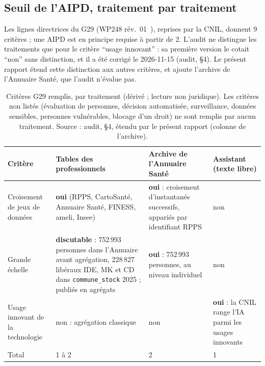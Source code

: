 \subsection{Seuil de l'AIPD, traitement par traitement}\label{conf:aipd}

Les lignes directrices du G29 (WP248 rév.~01~\citep{e-wp248}), reprises par la CNIL, donnent 9\mesure{} critères ; une AIPD est en principe requise à partir de 2\mesure{}.
L'audit ne distingue les traitements que pour le critère \enquote{usage innovant} : sa première version le cotait \enquote{non} sans distinction, et il a été corrigé le 2026-11-15 (audit, §4).
Le présent rapport étend cette distinction aux autres critères, et ajoute l'archive de l'Annuaire Santé, que l'audit n'évalue pas.

\begin{table}[htbp]\centering\small
\caption{Critères G29 remplis, par traitement (dérivé ; lecture non juridique). Les critères non listés (évaluation de personnes, décision automatisée, surveillance, données sensibles, personnes vulnérables, blocage d'un droit) ne sont remplis par aucun traitement. Source : audit, §4, étendu par le présent rapport (colonne de l'archive).}\label{conf:tab-aipd}
\begin{tabular}{@{}p{}p{}p{}p{}@{}}
\toprule Critère & Tables des professionnels & Archive de l'Annuaire Santé & Assistant (texte libre) \\ \midrule
Croisement de jeux de données & \textbf{oui} (RPPS, CartoSanté, Annuaire Santé, FINESS, ameli, Insee) & \textbf{oui} : croisement d'instantanés successifs, appariés par identifiant RPPS & non \\
Grande échelle & \textbf{discutable} : 752\,993\mesure{} personnes dans l'Annuaire avant agrégation, 228\,827\mesure{} libéraux IDE, MK et CD dans \texttt{commune\_\allowbreak{}stock} 2025 ; publiés en agrégats & \textbf{oui} : 752\,993\mesure{} personnes, au niveau individuel & non \\
Usage innovant de la technologie & non : agrégation classique & non & \textbf{oui} : la CNIL range l'IA parmi les usages innovants \\ \midrule
Total & 1 à 2\derive{} & 2\derive{} & 1\derive{} \\ \bottomrule
\end{tabular}
\end{table}

